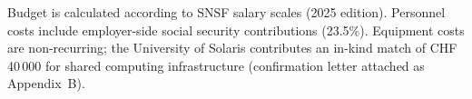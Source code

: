 \vspace{4pt}
{\small\color{SNSFgray}
Budget is calculated according to SNSF salary scales (2025 edition). Personnel costs include
employer-side social security contributions (23.5\%). Equipment costs are non-recurring; the
University of Solaris contributes an in-kind match of CHF 40\,000 for shared computing
infrastructure (confirmation letter attached as Appendix~B).}

\vspace{8pt}

